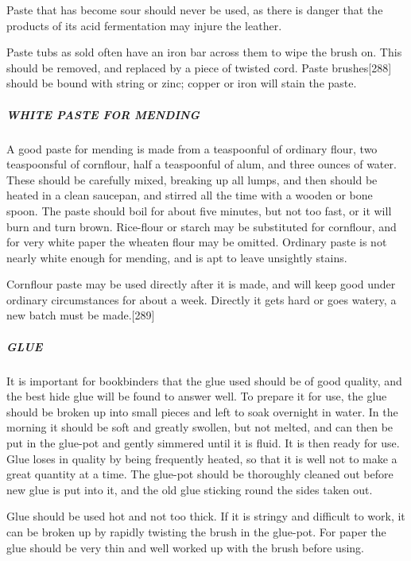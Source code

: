 \documentclass[
]{article}
\begin{document}
Paste that has become sour should never be used, as there is danger that
the products of its acid fermentation may injure the leather.

Paste tubs as sold often have an iron bar across them to wipe the brush
on. This should be removed, and replaced by a piece of twisted cord.
Paste brushes{\protect\hypertarget{Page_288}{}{{[}288{]}}} should be
bound with string or zinc; copper or iron will stain the paste.

\hypertarget{white-paste-for-mending}{%
\subparagraph{WHITE PASTE FOR MENDING}\label{white-paste-for-mending}}

A good paste for mending is made from a teaspoonful of ordinary flour,
two teaspoonsful of cornflour, half a teaspoonful of alum, and three
ounces of water. These should be carefully mixed, breaking up all lumps,
and then should be heated in a clean saucepan, and stirred all the time
with a wooden or bone spoon. The paste should boil for about five
minutes, but not too fast, or it will burn and turn brown. Rice-flour or
starch may be substituted for cornflour, and for very white paper the
wheaten flour may be omitted. Ordinary paste is not nearly white enough
for mending, and is apt to leave unsightly stains.

Cornflour paste may be used directly after it is made, and will keep
good under ordinary circumstances for about a week. Directly it gets
hard or goes watery, a new batch must be
made.{\protect\hypertarget{Page_289}{}{{[}289{]}}}

\hypertarget{glue}{%
\subparagraph{GLUE}\label{glue}}

It is important for bookbinders that the glue used should be of good
quality, and the best hide glue will be found to answer well. To prepare
it for use, the glue should be broken up into small pieces and left to
soak overnight in water. In the morning it should be soft and greatly
swollen, but not melted, and can then be put in the glue-pot and gently
simmered until it is fluid. It is then ready for use. Glue loses in
quality by being frequently heated, so that it is well not to make a
great quantity at a time. The glue-pot should be thoroughly cleaned out
before new glue is put into it, and the old glue sticking round the
sides taken out.

Glue should be used hot and not too thick. If it is stringy and
difficult to work, it can be broken up by rapidly twisting the brush in
the glue-pot. For paper the glue should be very thin and well worked up
with the brush before using.
\end{document}
